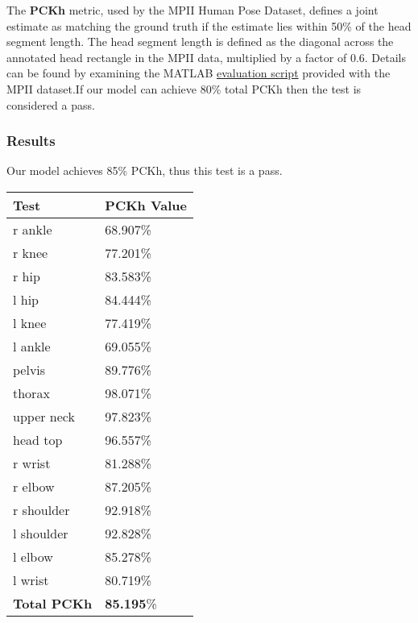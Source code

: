 \documentclass{scrreprt}
\begin{document}
The \textbf{PCKh} metric, used by the MPII Human Pose Dataset, defines a joint
estimate as matching the ground truth if the estimate lies within 50\% of the
head segment length. The head segment length is
defined as the diagonal across the annotated head rectangle in the MPII data,
multiplied by a factor of 0.6. Details can be found by examining the MATLAB
\href{http://human-pose.mpi-inf.mpg.de/results/mpii_human_pose/evalMPII.zip}{evaluation script}
provided with the MPII dataset.If our model can achieve 80\% total PCKh then the test is considered a pass.

\subsubsection{Results}

Our model achieves 85\% PCKh, thus this test is a pass.
\begin{table}[H]
    \centering
    \begin{tabular}{||p{2.5cm}|p{2.5cm}||}
        \hline
        \textbf{Test} & \textbf {PCKh Value}\\
         \hline\hline
        r ankle & 68.907\% \\
        \hline
        r knee &  77.201\% \\
        \hline
        r hip & 83.583\% \\
        \hline
        l hip & 84.444\% \\
        \hline
        l knee & 77.419\% \\
        \hline
        l ankle & 69.055\% \\
        \hline
        pelvis & 89.776\% \\
        \hline
        thorax & 98.071\% \\
        \hline
        upper neck & 97.823\% \\
        \hline
        head top & 96.557\% \\
        \hline
        r wrist & 81.288\% \\
        \hline
        r elbow & 87.205\% \\
        \hline
        r shoulder & 92.918\% \\
        \hline
        l shoulder & 92.828\% \\
        \hline
        l elbow & 85.278\% \\
        \hline
        l wrist & 80.719\% \\
        \hline
        \textbf {Total PCKh} & \textbf {85.195}\% \\
        \hline
    \end{tabular}
\end{table}
\end{document}
